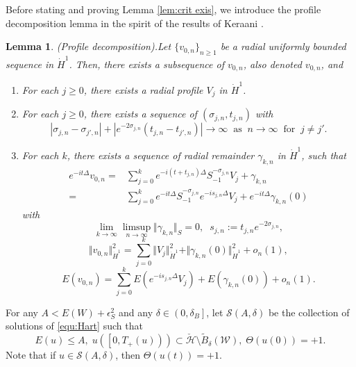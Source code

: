 \documentclass[reqno, 11pt]{amsart}
\numberwithin{equation}{section}
\theoremstyle{plain}
\newtheorem{lemma}[theorem]{Lemma}
\theoremstyle{definition}
\numberwithin{equation}{section}
\numberwithin{theorem}{section}
\numberwithin{equation}{section}
\numberwithin{equation}{section}
\numberwithin{theorem}{section}
\begin{document}
	Before stating and proving Lemma \ref{lem:crit exis}, we introduce the profile decomposition lemma in the spirit of the results of Keraani \cite{Ker}.
	\begin{lemma}(Profile decomposition).\label{lem:profile} Let $\{v_{0,n}\}_{n\geq 1}$ be a radial uniformly bounded sequence in $\dot H^1$. Then, there exists a subsequence of $v_{0,n}$, also denoted $v_{0,n}$, and
		\begin{enumerate}
			\item[$(1)$] For each $j\geq0$, there exists a radial profile $V_j$ in $\dot H^1$.
			\item[$(2)$] For each $j\geq0$, there exists a sequence of $(\sigma_{j,n},t_{j,n})$ with
			\begin{equation}\label{orth cond}
			|\sigma_{j,n}-\sigma_{j',n}|+|e^{-2\sigma_{j,n}}(t_{j,n}-t_{j',n})|\rightarrow\infty\;\;\text{as}\;\; n \rightarrow \infty \;\;\text{for}\;\; j\neq j'.
			\end{equation}
			\item[$(3)$] For each $k$, there exists a sequence of radial remainder $\gamma_{k,n}$ in $\dot H^1$, such that
			\begin{equation*}
			\begin{aligned}
			e^{-it\Delta}v_{0,n}=&\sum_{j=0}^k e^{-i(t+t_{j,n})\Delta}S_{-1}^{-\sigma_{j,n}}V_j +\gamma_{k,n}\\=& \sum_{j=0}^k e^{-it\Delta}S_{-1}^{-\sigma_{j,n}}e^{-is_{j,n}\Delta}V_j +e^{-it\Delta}\gamma_{k,n}(0)
			\end{aligned}
			\end{equation*}
			with
			\begin{equation}\label{asym}
			\lim_{k \to \infty}\limsup_{n \to \infty} \Vert \gamma_{k,n} \Vert_{S}=0, \;\;s_{j,n}:=t_{j,n}e^{-2\sigma_{j,n}},
			\end{equation}
			\begin{equation}\label{pathak}
			\Vert v_{0,n} \Vert_{\dot H^1}^2=\sum_{j=0}^k \Vert V_j \Vert_{\dot H^1}^2 +\Vert \gamma_{k,n}(0) \Vert_{\dot H^1}^2 +o_n(1),
			\end{equation}
			\begin{equation*}
			E(v_{0,n})=\sum_{j=0}^k E(e^{-is_{j,n}\Delta}V_j)+E(\gamma_{k,n}(0))+o_n(1).
			\end{equation*}
		\end{enumerate}
	\end{lemma}
	For any $A<E(W)+\epsilon_{S}^2$ and any $\delta\in \left( 0,\delta_{B} \right]$, let $\mathscr{S}(A,\delta)$ be the collection of solutions of \eqref{equ:Hart} such that
	\begin{equation*}
	E(u)\leq A,\; u(\left[0,T_+(u)  \right) )\subset \check{\mathcal{H}}\setminus \widetilde{B}_{\delta}(\mathcal{W}),\;\Theta(u(0))=+1.
	\end{equation*}
	Note that if $u\in\mathscr{S}(A,\delta)$, then $\Theta(u(t))=+1$.
	
\end{document}
